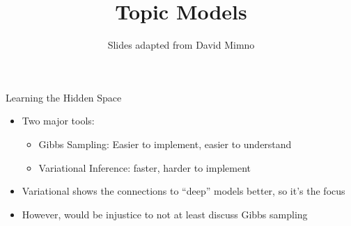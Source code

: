 \documentclass[compress]{beamer}
\title{Topic Models}
\date{Slides adapted from David Mimno}
\begin{document}
\frame{\titlepage
}

\begin{frame}{Learning the Hidden Space}

  \begin{itemize}
    \item Two major tools:
      \begin{itemize}
        \item Gibbs Sampling: Easier to implement, easier to understand
        \item Variational Inference: faster, harder to implement
      \end{itemize}
    \item Variational shows the connections to ``deep'' models better, so it's the focus
    \item However, would be injustice to not at least discuss Gibbs sampling
  \end{itemize}

\end{frame}

%


\begin{frame}

\tiny

\end{frame}
\end{document}
